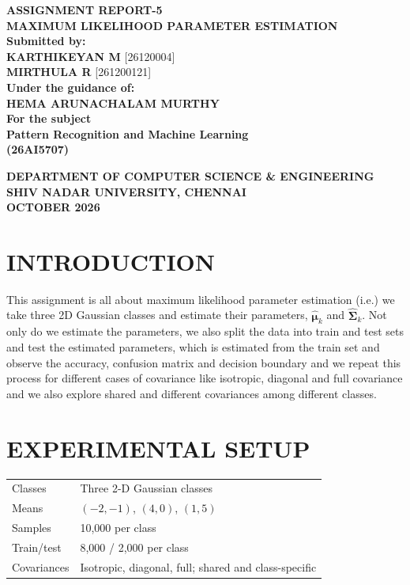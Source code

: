 \documentclass[11pt,a4paper]{article}
\begin{document}
\begin{titlepage}
\centering
\vspace*{2cm}
{\Large\textbf{ASSIGNMENT REPORT-5}}\\[0.7cm]
{\large\textbf{MAXIMUM LIKELIHOOD PARAMETER ESTIMATION}}\\[1.7cm]
\textbf{Submitted by:}\\[0.4cm]
\textbf{KARTHIKEYAN M} [26120004]\\[0.3cm]
\textbf{MIRTHULA R} [261200121]\\[1.8cm]
\textbf{Under the guidance of:}\\[0.4cm]
\textbf{HEMA ARUNACHALAM MURTHY}\\[1.5cm]
\textbf{For the subject}\\[0.4cm]
{\Large\textbf{Pattern Recognition and Machine Learning}}\\[0.3cm]
\textbf{(26AI5707)}
\vspace{2cm}

{\textbf{DEPARTMENT OF COMPUTER SCIENCE \& ENGINEERING}\\[0.3cm]
\textbf{SHIV NADAR UNIVERSITY, CHENNAI}\\[0.3cm]
\textbf{OCTOBER 2026}}
\end{titlepage}

\section*{INTRODUCTION}

This assignment is all about maximum likelihood parameter estimation (i.e.) we take three 2D Gaussian classes and estimate their parameters, $\hat{\boldsymbol\mu}_k$ and $\hat{\boldsymbol\Sigma}_k$. Not only do we estimate the parameters, we also split the data into train and test sets and test the estimated parameters, which is estimated from the train set and observe the accuracy, confusion matrix and decision boundary and we repeat this process for different cases of covariance like isotropic, diagonal and full covariance and we also explore shared and different covariances among different classes.

\section*{EXPERIMENTAL SETUP}
\begin{center}
\begin{tabular}{ll}
\toprule
Classes & Three 2-D Gaussian classes \\
Means & $(-2,-1)$, $(4,0)$, $(1,5)$ \\
Samples & 10,000 per class \\
Train/test & 8,000 / 2,000 per class \\
Covariances & Isotropic, diagonal, full; shared and class-specific \\
\bottomrule
\end{tabular}
\end{center}
\end{document}
